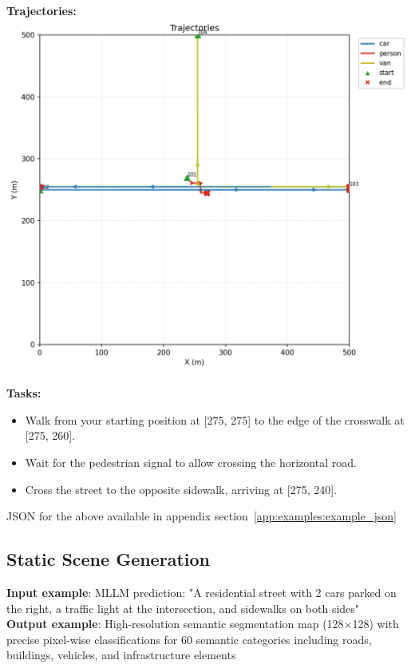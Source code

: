 \documentclass{article}
\begin{document}
\begin{tcolorbox}[examplebox, title=Scene Specification Format]
\textbf{Trajectories:}\\
\includegraphics[width=0.8\linewidth]{images/gemini_dynamic.png}


\label{fig:gemini_dynamic_example}


\textbf{Tasks:}
\begin{itemize}[leftmargin=1.2em]
    \item Walk from your starting position at [275, 275] to the edge of the crosswalk at [275, 260].
    \item Wait for the pedestrian signal to allow crossing the horizontal road.
    \item Cross the street to the opposite sidewalk, arriving at [275, 240].
\end{itemize}

JSON for the above available in appendix section~\ref{app:examples:example_json}


\end{tcolorbox}

\subsection{Static Scene Generation}

\begin{tcolorbox}

\textbf{Input example}: MLLM prediction: "A residential street with 2 cars parked on the right, a traffic light at the intersection, and sidewalks on both sides" \\

\textbf{Output example}: High-resolution semantic segmentation map (128×128) with precise pixel-wise classifications for 60 semantic categories including roads, buildings, vehicles, and infrastructure elements

\end{tcolorbox}
\end{document}
